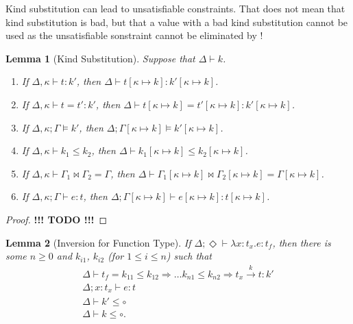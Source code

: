 \documentclass{article}
\newcommand{\KVAR}{\kappa}
\newcommand{\ONE}{\circ}
\newcommand{\TASS}[1]{#1\colon\!}
\newcommand{\LAM}[2]{\lambda\TASS{#1}#2.}
\newcommand{\KENV}{\Delta}
\newcommand{\TENV}{\Gamma}
\newcommand{\TENVEMPTY}{\Diamond}
\newcommand{\SPLIT}[3]{#1 \Join #2 = #3}
\newtheorem{lemma}{Lemma}
\begin{document}
Kind substitution can lead to unsatisfiable constraints. That does not
mean that kind substitution is bad, but that a value with a bad kind
substitution cannot be used as the unsatisfiable sonstraint cannot be
eliminated by !
\begin{lemma}[Kind Substitution]\label{lemma:kind-substitution}
  Suppose that $\KENV \vdash k$.
  \begin{enumerate}
  \item If $\KENV, \KVAR \vdash t : k'$,
    then $\KENV \vdash t[\KVAR \mapsto k] : k'[\KVAR \mapsto k]$.
  \item If $\KENV, \KVAR \vdash t = t' : k'$,
    then $\KENV \vdash t[\KVAR \mapsto k] = t'[\KVAR \mapsto k] : k'[\KVAR \mapsto k]$.
  \item If $\KENV, \KVAR ; \TENV \models k'$,
    then $\KENV; \TENV[\KVAR \mapsto k] \models k'[\KVAR \mapsto k]$.
  \item If $\KENV,\KVAR \vdash k_1 \le k_2$,
    then $\KENV \vdash k_1[\KVAR \mapsto k] \le k_2[\KVAR \mapsto k]$.
  \item If $\KENV, \KVAR \vdash \SPLIT{\TENV_1}{\TENV_2}{\TENV}$,
    then $\KENV \vdash \SPLIT{\TENV_1[\KVAR \mapsto k]}{\TENV_2[\KVAR \mapsto k]}{\TENV[\KVAR \mapsto k]}$. 
  \item If $\KENV, \KVAR; \TENV \vdash e : t$,
    then $\KENV; \TENV[\KVAR \mapsto k] \vdash e[\KVAR \mapsto k] : t[\KVAR \mapsto k]$.
  \end{enumerate}
\end{lemma}
\begin{proof}
  \textbf{!!! TODO !!!}
\end{proof}
\begin{lemma}[Inversion for Function Type]\label{lemma:inversion-function}
  If $\KENV; \TENVEMPTY \vdash \LAM x {t_x} e : t_f$,
  then there is some $n\ge0$ and $k_{i1}$, $k_{i2}$ (for $1\le i\le n$) such that 
  \begin{gather}
    \KENV \vdash t_f = k_{11}\le k_{12}\Rightarrow \dots k_{n1}\le k_{n2} \Rightarrow t_x \stackrel{k}\to t : k'
    \\
    \KENV; \TASS x{t_x} \vdash e : t
    \\
    \KENV \vdash k' \le \ONE
    \\
    \KENV \vdash k \le \ONE
    \mathrm{.}
  \end{gather}
\end{lemma}
\end{document}
